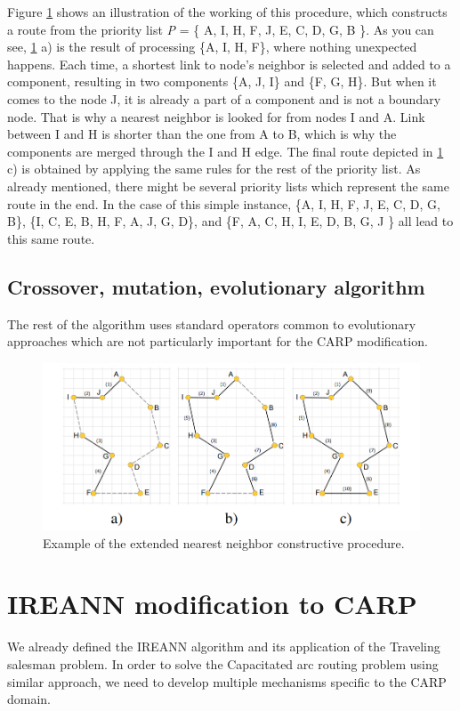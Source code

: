 \documentclass[oneside]{ctuthesis}
\theoremstyle{plain}
\theoremstyle{definition}
\theoremstyle{note}
\begin{document}
Figure \ref{fig:tsp} shows an illustration of the working of this procedure, which constructs a route from the priority list \emph{P} = \{ A, I, H, F, J, E, C, D, G, B \}. As you can see, \ref{fig:tsp} a) is the result of processing \{A, I, H, F\}, where nothing unexpected happens. Each time, a shortest link to node's neighbor is selected and added to a component, resulting in two components \{A, J, I\} and \{F, G, H\}. But when it comes to the node J, it is already a part of a component and is not a boundary node. That is why a nearest neighbor is looked for from nodes I and A. Link between I and H is shorter than the one from A to B, which is why the components are merged through the I and H edge. The final route depicted in \ref{fig:tsp} c) is obtained by applying the same rules for the rest of the priority list.
As already mentioned, there might be several priority lists which represent the same route in the end. In the case of this simple instance,  \{A, I, H, F, J, E, C, D, G, B\}, \{I, C, E, B, H, F, A, J, G, D\}, and \{F, A, C, H, I, E, D, B, G, J \} all lead to this same route. 

\subsection{Crossover, mutation, evolutionary algorithm}
The rest of the algorithm uses standard operators common to evolutionary approaches which are not particularly important for the CARP modification.


\begin{figure}
	\includegraphics[width=\linewidth]{tspexample.png}
	\caption{Example of the extended nearest neighbor constructive
		procedure.}
	\label{fig:tsp}
\end{figure}


\section{IREANN modification to CARP}
We already defined the IREANN algorithm and its application of the Traveling salesman problem. In order to solve the Capacitated arc routing problem using similar approach, we need to develop multiple mechanisms specific to the CARP domain.
\end{document}
